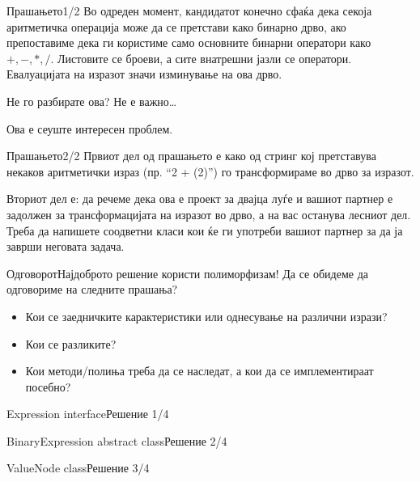 \begin{frame}{Прашањето}{1/2}
Во одреден момент, кандидатот конечно сфаќа дека секоја аритметичка операција
може да се претстави како бинарно дрво, ако препоставиме дека ги користиме само
основните бинарни оператори како $+, -, *, /$. Листовите се броеви, а
сите внатрешни јазли се оператори. Евалуацијата на изразот значи изминување на ова
дрво. 

Не го разбирате ова? Не е важно\ldots

Ова е сеуште интересен проблем.
\end{frame}

\begin{frame}{Прашањето}{2/2}
Првиот дел од прашањето е како од стринг кој претставува некаков аритметички
израз (пр. ``2 + (2)'') го трансформираме во дрво за изразот.

Вториот дел е: да речеме дека ова е проект за двајца луѓе и вашиот партнер е
задолжен за трансформацијата на изразот во дрво, а на вас останува лесниот дел.
Треба да напишете соодветни класи кои ќе ги употреби вашиот партнер за да ја
заврши неговата задача.

\end{frame}

\begin{frame}{Одговорот}{Најдоброто решение користи полиморфизам!}
Да се обидеме да одговориме на следните прашања?
\begin{itemize}
  \item Кои се заедничките карактеристики или однесување на различни изрази?
  \item Кои се разликите?
  \item Кои методи/полиња треба да се наследат, а кои да се имплементираат
  посебно?
\end{itemize}

\end{frame}


\begin{frame}[fragile]{Expression interface}{Решение 1/4}

\end{frame}

\begin{frame}[fragile]{BinaryExpression abstract class}{Решение 2/4}

\end{frame}

\begin{frame}[fragile]{ValueNode class}{Решение 3/4}

\end{frame}

